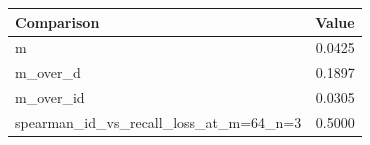 \begin{tabular}{lr}
\toprule
Comparison & Value \\
\midrule
m & 0.0425 \\
m\_over\_d & 0.1897 \\
m\_over\_id & 0.0305 \\
spearman\_id\_vs\_recall\_loss\_at\_m=64\_n=3 & 0.5000 \\
\bottomrule
\end{tabular}
